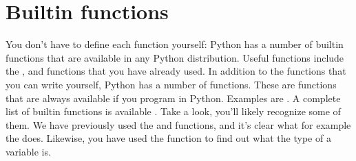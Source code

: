 \documentclass[letterpaper,10pt,english]{jupyterBook}
\begin{document}
\section{Built\sphinxhyphen{}in functions}
\label{\detokenize{notebooks/04_Functions/04_Functions_student:built-in-functions}}
\sphinxAtStartPar
You don’t have to define each function yourself: Python has a number of built\sphinxhyphen{}in functions that are available in any Python distribution. Useful functions include the ,  and  functions that you have already used. In addition to the functions that you can write yourself, Python has a number of  functions. These are functions that are always available if you program in Python. Examples are . A complete list of built\sphinxhyphen{}in functions is available . Take a look, you’ll likely recognize some of them. We have previously used the  and  functions, and it’s clear what \sphinxhyphen{} for example \sphinxhyphen{} the  does. Likewise, you have used the  function to find out what the type of a variable is.
\end{document}
